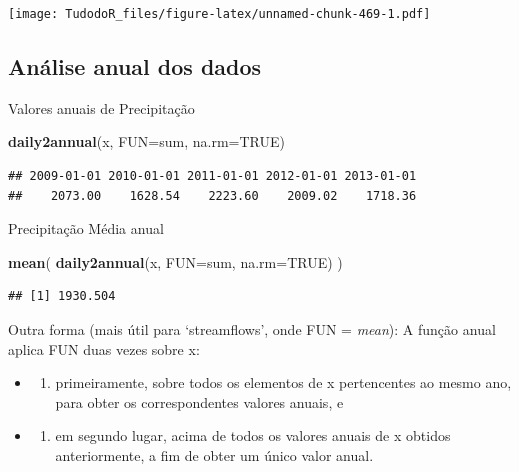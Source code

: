 \documentclass[
]{book}
\newenvironment{Shaded}{\begin{snugshade}}{\end{snugshade}}
\newcommand{\DataTypeTok}[1]{\textcolor[rgb]{0.13,0.29,0.53}{#1}}
\newcommand{\KeywordTok}[1]{\textcolor[rgb]{0.13,0.29,0.53}{\textbf{#1}}}
\newcommand{\NormalTok}[1]{#1}
\newcommand{\OtherTok}[1]{\textcolor[rgb]{0.56,0.35,0.01}{#1}}
\providecommand{\tightlist}{%
  \setlength{\itemsep}{0pt}\setlength{\parskip}{0pt}}
\begin{document}
\texttt{[image: TudodoR\_files/figure-latex/unnamed-chunk-469-1.pdf]}

\hypertarget{anuxe1lise-anual-dos-dados}{%
\subsection{Análise anual dos dados}\label{anuxe1lise-anual-dos-dados}}

Valores anuais de Precipitação

\begin{Shaded}
\begin{Highlighting}[]
\KeywordTok{daily2annual}\NormalTok{(x, }\DataTypeTok{FUN=}\NormalTok{sum, }\DataTypeTok{na.rm=}\OtherTok{TRUE}\NormalTok{)}
\end{Highlighting}
\end{Shaded}

\begin{verbatim}
## 2009-01-01 2010-01-01 2011-01-01 2012-01-01 2013-01-01 
##    2073.00    1628.54    2223.60    2009.02    1718.36
\end{verbatim}

Precipitação Média anual

\begin{Shaded}
\begin{Highlighting}[]
\KeywordTok{mean}\NormalTok{( }\KeywordTok{daily2annual}\NormalTok{(x, }\DataTypeTok{FUN=}\NormalTok{sum, }\DataTypeTok{na.rm=}\OtherTok{TRUE}\NormalTok{) )}
\end{Highlighting}
\end{Shaded}

\begin{verbatim}
## [1] 1930.504
\end{verbatim}

Outra forma (mais útil para `streamflows', onde FUN = \emph{mean}): A função anual aplica FUN duas vezes sobre x:

\begin{itemize}
\item
  \begin{enumerate}
  \def\labelenumi{(\roman{enumi})}
  \tightlist
  \item
    primeiramente, sobre todos os elementos de x pertencentes ao mesmo ano, para obter os correspondentes valores anuais, e
  \end{enumerate}
\item
  \begin{enumerate}
  \def\labelenumi{(\roman{enumi})}
  \setcounter{enumi}{1}
  \tightlist
  \item
    em segundo lugar, acima de todos os valores anuais de x obtidos anteriormente, a fim de obter um único valor anual.
  \end{enumerate}
\end{itemize}
\end{document}

